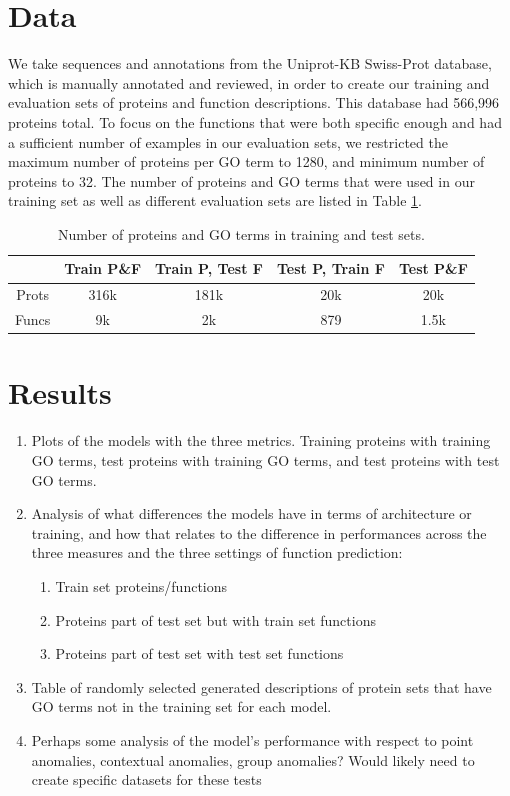 \documentclass{article}
\begin{document}
\section{Data}
We take sequences and annotations from the Uniprot-KB Swiss-Prot database, which is manually annotated and reviewed, in order to create our training and evaluation sets of proteins and function descriptions. This database had 566,996 proteins total. To focus on the functions that were both specific enough and had a sufficient number of examples in our evaluation sets, we restricted the maximum number of proteins per GO term to 1280, and minimum number of proteins to 32. The number of proteins and GO terms that were used in our training set as well as different evaluation sets are listed in Table \ref{tab:datasets}.
\begin{table}
    \caption{Number of proteins and GO terms in training and test sets.}
	\centering
	\begin{tabular}{c|cccc}
		\toprule
         & Train P\&F & Train P, Test F & Test P, Train F & Test P\&F \\
		\midrule
        Prots & 316k & 181k & 20k & 20k \\
        Funcs & 9k & 2k & 879 & 1.5k \\
		\bottomrule
	\end{tabular}
	\label{tab:datasets}
\end{table}

\section{Results} %
\begin{enumerate}
    \item Plots of the models with the three metrics.
Training proteins with training GO terms, test proteins with training GO terms, and test proteins with test GO terms.
    \item Analysis of what differences the models have in terms of architecture or training, and how that relates to the difference in performances across the three measures and the three settings of function prediction:
        \begin{enumerate}
            \item Train set proteins/functions
            \item Proteins part of test set but with train set functions
            \item Proteins part of test set with test set functions
        \end{enumerate}
    \item Table of randomly selected generated descriptions of protein sets that have GO terms not in the training set for each model. %
    \item Perhaps some analysis of the model's performance with respect to point anomalies, contextual anomalies, group anomalies? Would likely need to create specific datasets for these tests %
\end{enumerate}
\end{document}
